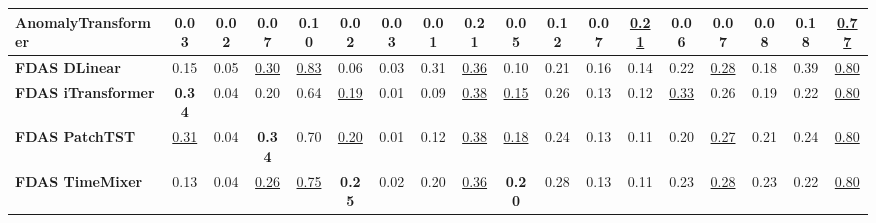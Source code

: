 \documentclass[border=2pt]{standalone}
\begin{document}
\begin{tabular}{l|ccccccccccccccccc}
AnomalyTransformer     & 0.03 & 0.02 & 0.07 & 0.10 & 0.02 & 0.03 & 0.01 & 0.21 & 0.05 & 0.12 & 0.07 & \underline{0.21} & 0.06 & 0.07 & 0.08 & 0.18 & \underline{0.77} \\
\midrule
\textbf{FDAS DLinear}  & 0.15 & 0.05 & \underline{0.30} & \underline{0.83} & 0.06 & 0.03 & 0.31 & \underline{0.36} & 0.10 & 0.21 & 0.16 & 0.14 & 0.22 & \underline{0.28} & 0.18 & 0.39 & \underline{0.80} \\
\textbf{FDAS iTransformer} & \textbf{0.34} & 0.04 & 0.20 & 0.64 & \underline{0.19} & 0.01 & 0.09 & \underline{0.38} & \underline{0.15} & 0.26 & 0.13 & 0.12 & \underline{0.33} & 0.26 & 0.19 & 0.22 & \underline{0.80} \\
\textbf{FDAS PatchTST} & \underline{0.31} & 0.04 & \textbf{0.34} & 0.70 & \underline{0.20} & 0.01 & 0.12 & \underline{0.38} & \underline{0.18} & 0.24 & 0.13 & 0.11 & 0.20 & \underline{0.27} & 0.21 & 0.24 & \underline{0.80} \\
\textbf{FDAS TimeMixer} & 0.13 & 0.04 & \underline{0.26} & \underline{0.75} & \textbf{0.25} & 0.02 & 0.20 & \underline{0.36} & \textbf{0.20} & 0.28 & 0.13 & 0.11 & 0.23 & \underline{0.28} & 0.23 & 0.22 & \underline{0.80} \\
\bottomrule
\end{tabular}
\end{document}
